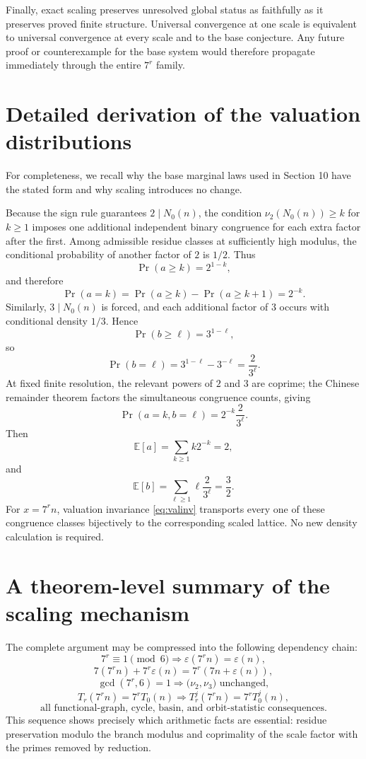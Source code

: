 \documentclass[11pt]{article}
\newcommand{\eps}{\varepsilon}
\begin{document}
Finally, exact scaling preserves unresolved global status as faithfully as it preserves proved finite structure. Universal convergence at one scale is equivalent to universal convergence at every scale and to the base conjecture. Any future proof or counterexample for the base system would therefore propagate immediately through the entire $7^r$ family.

\appendix
\section{Detailed derivation of the valuation distributions}
For completeness, we recall why the base marginal laws used in Section 10 have the stated form and why scaling introduces no change.

Because the sign rule guarantees $2\mid N_0(n)$, the condition $\nu_2(N_0(n))\ge k$ for $k\ge1$ imposes one additional independent binary congruence for each extra factor after the first. Among admissible residue classes at sufficiently high modulus, the conditional probability of another factor of $2$ is $1/2$. Thus
\[
\Pr(a\ge k)=2^{1-k},
\]
and therefore
\[
\Pr(a=k)=\Pr(a\ge k)-\Pr(a\ge k+1)=2^{-k}.
\]
Similarly, $3\mid N_0(n)$ is forced, and each additional factor of $3$ occurs with conditional density $1/3$. Hence
\[
\Pr(b\ge\ell)=3^{1-\ell},
\]
so
\[
\Pr(b=\ell)=3^{1-\ell}-3^{-\ell}=\frac{2}{3^\ell}.
\]
At fixed finite resolution, the relevant powers of $2$ and $3$ are coprime; the Chinese remainder theorem factors the simultaneous congruence counts, giving
\[
\Pr(a=k,b=\ell)=2^{-k}\frac{2}{3^\ell}.
\]
Then
\[
\mathbb E[a]=\sum_{k\ge1}k2^{-k}=2,
\]
and
\[
\mathbb E[b]=\sum_{\ell\ge1}\ell\frac{2}{3^\ell}=\frac32.
\]
For $x=7^rn$, valuation invariance \eqref{eq:valinv} transports every one of these congruence classes bijectively to the corresponding scaled lattice. No new density calculation is required.

\section{A theorem-level summary of the scaling mechanism}
The complete argument may be compressed into the following dependency chain:
\[
7^r\equiv1\pmod6
\Longrightarrow
\eps(7^rn)=\eps(n),
\]
\[
7(7^rn)+7^r\eps(n)=7^r(7n+\eps(n)),
\]
\[
\gcd(7^r,6)=1
\Longrightarrow
\bigl(\nu_2,\nu_3\bigr)\text{ unchanged},
\]
\[
T_r(7^rn)=7^rT_0(n)
\Longrightarrow
T_r^j(7^rn)=7^rT_0^j(n),
\]
\[
\text{all functional-graph, cycle, basin, and orbit-statistic consequences.}
\]
This sequence shows precisely which arithmetic facts are essential: residue preservation modulo the branch modulus and coprimality of the scale factor with the primes removed by reduction.
\end{document}
